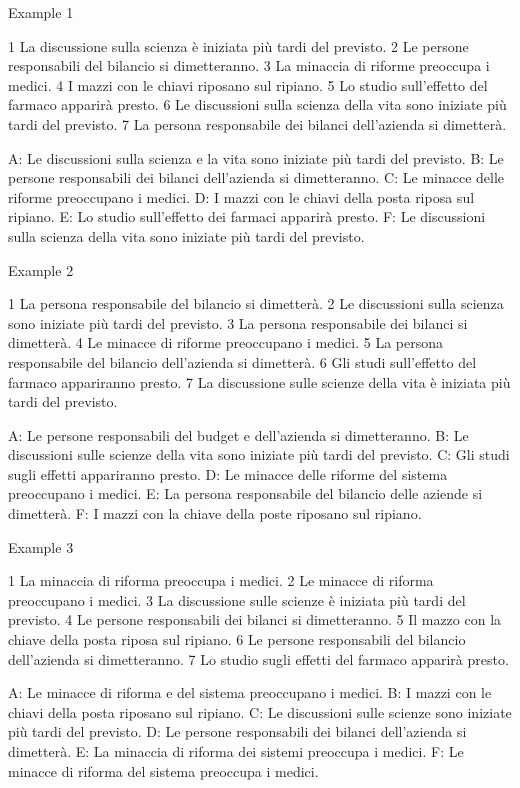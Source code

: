Example 1

1 La discussione sulla scienza è iniziata più tardi del previsto.
2 Le persone responsabili del bilancio si dimetteranno.
3 La minaccia di riforme preoccupa i medici.
4 I mazzi con le chiavi riposano sul ripiano.
5 Lo studio sull'effetto del farmaco apparirà presto.
6 Le discussioni sulla scienza della vita sono iniziate più tardi del previsto.
7 La persona responsabile dei bilanci dell'azienda si dimetterà.

A: Le discussioni sulla scienza e la vita sono iniziate più tardi del previsto.
B: Le persone responsabili dei bilanci dell'azienda si dimetteranno.
C: Le minacce delle riforme preoccupano i medici.
D: I mazzi con le chiavi della posta riposa sul ripiano.
E: Lo studio sull'effetto dei farmaci apparirà presto.
F: Le discussioni sulla scienza della vita sono iniziate più tardi del previsto.

Example 2

1 La persona responsabile del bilancio si dimetterà.
2 Le discussioni sulla scienza sono iniziate più tardi del previsto.
3 La persona responsabile dei bilanci si dimetterà.
4 Le minacce di riforme preoccupano i medici.
5 La persona responsabile del bilancio dell'azienda si dimetterà.
6 Gli studi sull'effetto del farmaco appariranno presto.
7 La discussione sulle scienze della vita è iniziata più tardi del previsto.


A: Le persone responsabili del budget e dell'azienda si dimetteranno.
B: Le discussioni sulle scienze della vita sono iniziate più tardi del previsto.
C: Gli studi sugli effetti appariranno presto.
D: Le minacce delle riforme del sistema preoccupano i medici.
E: La persona responsabile del bilancio delle aziende si dimetterà.
F: I mazzi con la chiave della poste riposano sul ripiano.

Example 3

1 La minaccia di riforma preoccupa i medici.
2 Le minacce di riforma preoccupano i medici.
3 La discussione sulle scienze è iniziata più tardi del previsto.
4 Le persone responsabili dei bilanci si dimetteranno.
5 Il mazzo con la chiave della posta riposa sul ripiano.
6 Le persone responsabili del bilancio dell'azienda si dimetteranno.
7 Lo studio sugli effetti del farmaco apparirà presto.

A: Le minacce di riforma e del sistema preoccupano i medici.
B: I mazzi con le chiavi della posta riposano sul ripiano.
C: Le discussioni sulle scienze sono iniziate più tardi del previsto.
D: Le persone responsabili dei bilanci dell'azienda si dimetterà.
E: La minaccia di riforma dei sistemi preoccupa i medici.
F: Le minacce di riforma del sistema preoccupa i medici.

